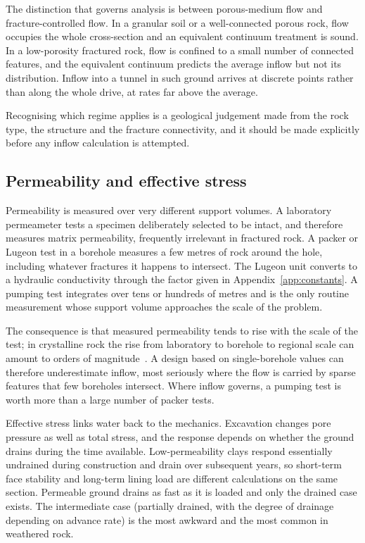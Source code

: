 The distinction that governs analysis is between porous-medium flow and
fracture-controlled flow. In a granular soil or a well-connected porous rock,
flow occupies the whole cross-section and an equivalent continuum treatment is
sound. In a low-porosity fractured rock, flow is confined to a small number of
connected features, and the equivalent continuum predicts the average
inflow but not its distribution. Inflow into a
tunnel in such ground arrives at discrete points rather than along the whole
drive, at rates far above the average.

Recognising which regime applies is a geological judgement made from the rock
type, the structure and the fracture connectivity, and it should be made
explicitly before any inflow calculation is attempted.

\subsection{Permeability and effective stress}
\label{sec:permeability}

Permeability is measured over very different support volumes. A laboratory
permeameter tests a specimen deliberately selected to be intact, and therefore
measures matrix permeability, frequently irrelevant in fractured rock. A
packer or Lugeon test in a borehole measures a few metres of rock around the
hole, including whatever fractures it happens to intersect. The Lugeon unit
converts to a hydraulic conductivity through the factor given in
Appendix~\ref{app:constants}. A pumping test
integrates over tens or hundreds of metres and is the only routine measurement
whose support volume approaches the scale of the problem.

The consequence is that measured permeability tends to rise with the scale of
the test; in crystalline rock the rise from laboratory to borehole to regional
scale can amount to orders of magnitude~\citep{clauser1992permeability}. A
design based on single-borehole values can therefore underestimate inflow,
most seriously where the flow is carried by sparse features that few boreholes
intersect. Where inflow governs, a pumping test is
worth more than a large number of packer tests.

Effective stress links water back to the mechanics. Excavation changes pore
pressure as well as total stress, and the response depends on whether the
ground drains during the time available. Low-permeability clays respond
essentially undrained during construction and drain over subsequent years,
so short-term face stability and long-term lining load are different
calculations on the same section. Permeable ground drains as fast as it is
loaded and only the drained case exists. The intermediate case (partially
drained, with the degree of drainage depending on advance rate) is the most
awkward and the most common in weathered rock.

